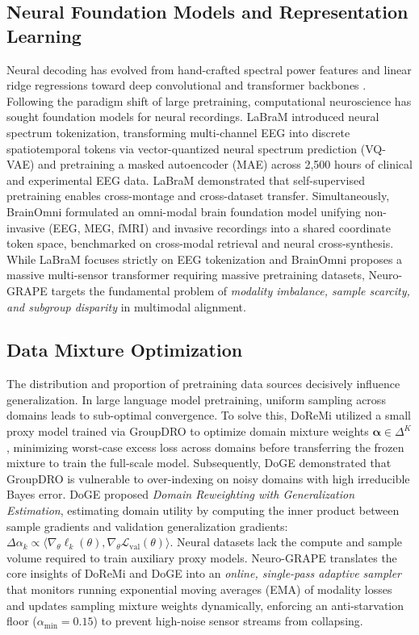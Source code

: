 \documentclass[conference]{IEEEtran}
\begin{document}
\subsection{Neural Foundation Models and Representation Learning}
Neural decoding has evolved from hand-crafted spectral power features and linear ridge regressions toward deep convolutional and transformer backbones \cite{peng2022ogmge, lawhern2018eegnet}. Following the paradigm shift of large pretraining, computational neuroscience has sought foundation models for neural recordings. LaBraM \cite{jiang2024labram} introduced neural spectrum tokenization, transforming multi-channel EEG into discrete spatiotemporal tokens via vector-quantized neural spectrum prediction (VQ-VAE) and pretraining a masked autoencoder (MAE) across 2,500 hours of clinical and experimental EEG data. LaBraM demonstrated that self-supervised pretraining enables cross-montage and cross-dataset transfer. Simultaneously, BrainOmni \cite{wu2024brainomni} formulated an omni-modal brain foundation model unifying non-invasive (EEG, MEG, fMRI) and invasive recordings into a shared coordinate token space, benchmarked on cross-modal retrieval and neural cross-synthesis. While LaBraM focuses strictly on EEG tokenization and BrainOmni proposes a massive multi-sensor transformer requiring massive pretraining datasets, Neuro-GRAPE targets the fundamental problem of \emph{modality imbalance, sample scarcity, and subgroup disparity} in multimodal alignment.

\subsection{Data Mixture Optimization}
The distribution and proportion of pretraining data sources decisively influence generalization. In large language model pretraining, uniform sampling across domains leads to sub-optimal convergence. To solve this, DoReMi \cite{xie2023doremi} utilized a small proxy model trained via GroupDRO to optimize domain mixture weights $\boldsymbol{\alpha} \in \Delta^K$, minimizing worst-case excess loss across domains before transferring the frozen mixture to train the full-scale model. Subsequently, DoGE \cite{fan2023doge} demonstrated that GroupDRO is vulnerable to over-indexing on noisy domains with high irreducible Bayes error. DoGE proposed \emph{Domain Reweighting with Generalization Estimation}, estimating domain utility by computing the inner product between sample gradients and validation generalization gradients:
$\Delta \alpha_k \propto \langle \nabla_\theta \ell_k(\theta), \nabla_\theta \mathcal{L}_{\text{val}}(\theta) \rangle$.
Neural datasets lack the compute and sample volume required to train auxiliary proxy models. Neuro-GRAPE translates the core insights of DoReMi and DoGE into an \emph{online, single-pass adaptive sampler} that monitors running exponential moving averages (EMA) of modality losses and updates sampling mixture weights dynamically, enforcing an anti-starvation floor ($\alpha_{\min} = 0.15$) to prevent high-noise sensor streams from collapsing.
\end{document}
